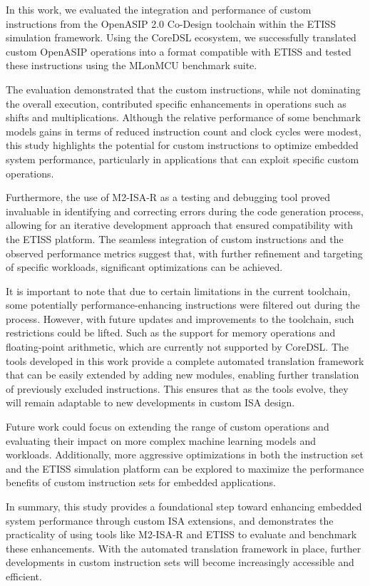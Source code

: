 In this work, we evaluated the integration and performance of custom instructions from the OpenASIP 2.0 Co-Design toolchain within the ETISS simulation framework. Using the CoreDSL ecosystem, we successfully translated custom OpenASIP operations into a format compatible with ETISS and tested these instructions using the MLonMCU benchmark suite.

The evaluation demonstrated that the custom instructions, while not dominating the overall execution, contributed specific enhancements in operations such as shifts and multiplications. Although the relative performance of some benchmark models gains in terms of reduced instruction count and clock cycles were modest, this study highlights the potential for custom instructions to optimize embedded system performance, particularly in applications that can exploit specific custom operations.

Furthermore, the use of M2-ISA-R as a testing and debugging tool proved invaluable in identifying and correcting errors during the code generation process, allowing for an iterative development approach that ensured compatibility with the ETISS platform. The seamless integration of custom instructions and the observed performance metrics suggest that, with further refinement and targeting of specific workloads, significant optimizations can be achieved.

It is important to note that due to certain limitations in the current toolchain, some potentially performance-enhancing instructions were filtered out during the process. However, with future updates and improvements to the toolchain, such restrictions could be lifted. Such as the support for memory operations and floating-point arithmetic, which are currently not supported by CoreDSL. The tools developed in this work provide a complete automated translation framework that can be easily extended by adding new modules, enabling further translation of previously excluded instructions. This ensures that as the tools evolve, they will remain adaptable to new developments in custom ISA design.

Future work could focus on extending the range of custom operations and evaluating their impact on more complex machine learning models and workloads. Additionally, more aggressive optimizations in both the instruction set and the ETISS simulation platform can be explored to maximize the performance benefits of custom instruction sets for embedded applications.

In summary, this study provides a foundational step toward enhancing embedded system performance through custom ISA extensions, and demonstrates the practicality of using tools like M2-ISA-R and ETISS to evaluate and benchmark these enhancements. With the automated translation framework in place, further developments in custom instruction sets will become increasingly accessible and efficient.